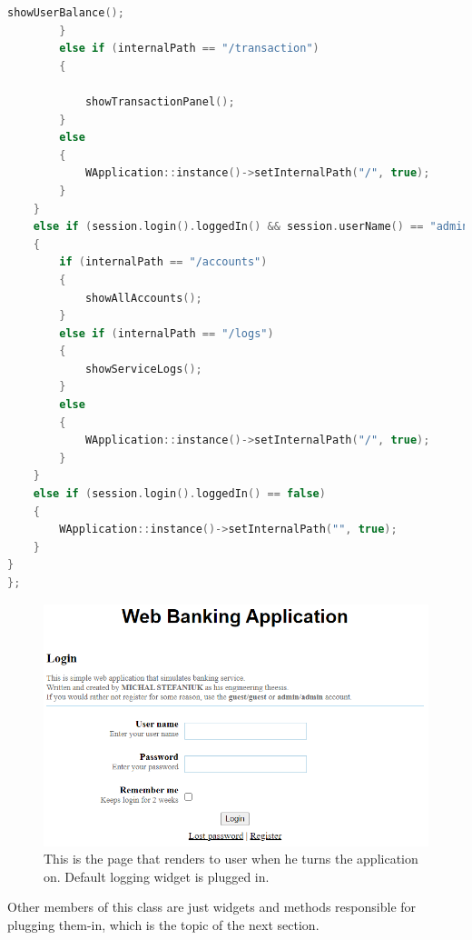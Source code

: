 \documentclass[a4paper,12pt]{book}
\begin{document}
{\begin{lstlisting}[frame=single, basicstyle=\small, language=C++, caption={handleInternalPath() function.}, captionpos=b]
			showUserBalance();
		}
		else if (internalPath == "/transaction")
		{

			showTransactionPanel();
		}
		else
		{
			WApplication::instance()->setInternalPath("/", true);
		}
	}
	else if (session.login().loggedIn() && session.userName() == "admin")
	{
		if (internalPath == "/accounts")
		{
			showAllAccounts();
		}
		else if (internalPath == "/logs")
		{
			showServiceLogs();
		}
		else
		{
			WApplication::instance()->setInternalPath("/", true);
		}
	}
	else if (session.login().loggedIn() == false)
	{
		WApplication::instance()->setInternalPath("", true);
	}
}
};
\end{lstlisting}

\begin{figure}[H]
\centering
\includegraphics[width=1.0\textwidth]{logpage}
\caption{This is the page that renders to user when he turns the application on. Default logging widget is plugged in.}
\end{figure}  

Other members of this class are just widgets and methods responsible for plugging them-in, which is the topic of the next section.
}
\end{document}
